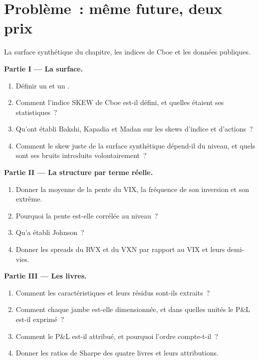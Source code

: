 \section{Problème~: même future, deux prix}

\begin{problem}\label{pb:s2:skew-and-term-structure-relative-value:1}
La surface synthétique du chapitre, les indices de Cboe et les données publiques.

\medskip\noindent\textbf{Partie I --- La surface.}
\begin{enumerate}
\item Définir un  et un .
\item Comment l'indice SKEW de Cboe est-il défini, et quelles étaient ses statistiques~?
\item Qu'ont établi Bakshi, Kapadia et Madan sur les skews d'indice et d'actions~?
\item Comment le skew juste de la surface synthétique dépend-il du niveau, et quels sont ses bruits introduits volontairement~?
\end{enumerate}

\medskip\noindent\textbf{Partie II --- La structure par terme réelle.}
\begin{enumerate}[resume]
\item Donner la moyenne de la pente du VIX, la fréquence de son inversion et son extrême.
\item Pourquoi la pente est-elle corrélée au niveau~?
\item Qu'a établi Johnson~?
\item Donner les spreads du RVX et du VXN par rapport au VIX et leurs demi-vies.
\end{enumerate}

\medskip\noindent\textbf{Partie III --- Les livres.}
\begin{enumerate}[resume]
\item Comment les caractéristiques et leurs résidus sont-ils extraits~?
\item Comment chaque jambe est-elle dimensionnée, et dans quelles unités le P\&L est-il exprimé~?
\item Comment le P\&L est-il attribué, et pourquoi l'ordre compte-t-il~?
\item Donner les ratios de Sharpe des quatre livres et leurs attributions.
\end{enumerate}


\end{problem}
